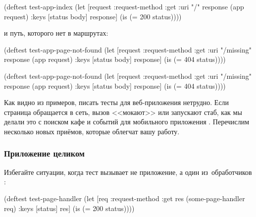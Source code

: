 \else

\begin{english}
  \begin{clojure}
(deftest test-app-index
  (let [request {:request-method :get :uri "/"}
        response (app request)
        {:keys [status body]} response]
    (is (= 200 status))))
  \end{clojure}
\end{english}

\fi

\noindent
и путь, которого нет в маршрутах:

\ifx\devicetype\mobile

\begin{english}
  \begin{clojure}
(deftest test-app-page-not-found
  (let [request {:request-method :get
                 :uri "/missing"}
        response (app request)
        {:keys [status body]} response]
    (is (= 404 status))))
  \end{clojure}
\end{english}

\else

\begin{english}
  \begin{clojure}
(deftest test-app-page-not-found
  (let [request {:request-method :get :uri "/missing"}
        response (app request)
        {:keys [status body]} response]
    (is (= 404 status))))
  \end{clojure}
\end{english}

\fi


Как видно из примеров, писать тесты для веб-приложения нетрудно. Если страница
обращается в сеть, вызов <<мокают>> или запускают стаб, как мы делали это с
поиском кафе и событий для мобильного приложения .
Перечислим несколько новых приёмов, которые облегчат вашу работу.

\subsubsection*{Приложение целиком}

Избегайте ситуации, когда тест вызывает не приложение, а один из~обработчиков
:

\begin{english}
  \begin{clojure/lines}
(deftest test-page-handler
  (let [req {:request-method :get}
        res (some-page-handler req)
        {:keys [status]} res]
    (is (= 200 status))))
  \end{clojure/lines}
\end{english}


